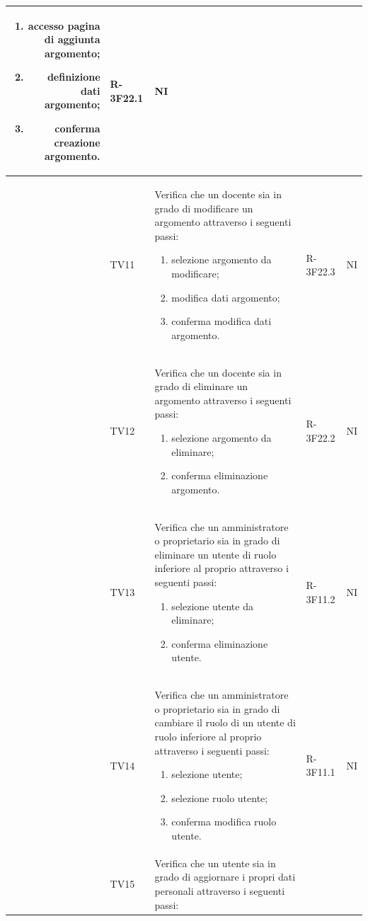 \documentclass[12pt,a4paper]{article}
\begin{document}
\begin{longtable}{r l p{10cm} l l}
		\begin{enumerate}
			\item accesso pagina di aggiunta argomento;
			\item definizione dati argomento;
			\item conferma creazione argomento.
		\end{enumerate} & R-3F22.1 & NI\tabularnewline
		\midrule
		& TV11 & Verifica che un docente sia in grado di modificare un argomento attraverso i seguenti passi:
		
		\begin{enumerate}
			\item selezione argomento da modificare;
			\item modifica dati argomento;
			\item conferma modifica dati argomento.
		\end{enumerate} & R-3F22.3 & NI\tabularnewline
		\midrule
		& TV12 & Verifica che un docente sia in grado di eliminare un argomento attraverso i seguenti passi:
		
		\begin{enumerate}
			\item selezione argomento da eliminare;
			\item conferma eliminazione argomento.
		\end{enumerate} & R-3F22.2 & NI\tabularnewline
		\midrule
		& TV13 & Verifica che un amministratore o proprietario sia in grado di eliminare un utente di ruolo inferiore al proprio attraverso i seguenti passi:
		
		\begin{enumerate}
			\item selezione utente da eliminare;
			\item conferma eliminazione utente.
		\end{enumerate} & R-3F11.2 & NI\tabularnewline
		\midrule
		& TV14 & Verifica che un amministratore o proprietario sia in grado di cambiare il ruolo di un utente di ruolo inferiore al proprio attraverso i seguenti passi:
		
		\begin{enumerate}
			\item selezione utente;
			\item selezione ruolo utente;
			\item conferma modifica ruolo utente.
		\end{enumerate} & R-3F11.1 & NI\tabularnewline
		\midrule
		& TV15 & Verifica che un utente sia in grado di aggiornare i propri dati personali attraverso i seguenti passi:
		

\end{longtable}
\end{document}
